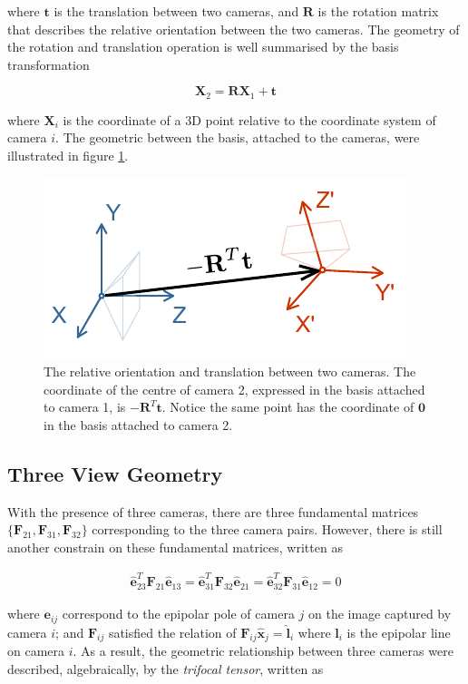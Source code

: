 \documentclass[11pt,twoside]{report}
\begin{document}
\noindent where $\mathbf{t}$ is the translation between two cameras, and $\mathbf{R}$ is the rotation matrix that describes the relative orientation between the two cameras. The geometry of the rotation and translation operation is well summarised by the basis transformation

$$
\mathbf{X}_2 = \mathbf{R} \mathbf{X}_1 + \mathbf{t}
$$

\noindent where $\mathbf{X}_i$ is the coordinate of a 3D point relative to the coordinate system of camera $i$. The geometric between the basis, attached to the cameras, were illustrated in figure \ref{fig:camera_basis}.

\begin{figure}
  \includegraphics[width=0.6\linewidth,outer]{camera-basis-change}
  \caption[Relative orientation of cameras]{The relative orientation and translation between two cameras. The coordinate of the centre of camera 2, expressed in the basis attached to camera 1, is $-\mathbf{R}^T\mathbf{t}$. Notice the same point has the coordinate of $\mathbf{0}$ in the basis attached to camera 2.}
  \label{fig:camera_basis}
\end{figure}

\subsection{Three View Geometry}

With the presence of three cameras, there are three fundamental matrices $\{\mathbf{F}_{21}, \mathbf{F}_{31}, \mathbf{F}_{32} \}$ corresponding to the three camera pairs. However, there is still another constrain on these fundamental matrices, written as \cite{hartley2003}

$$
\begin{aligned}
	  \hat{\mathbf{e}}_{23}^T\mathbf{F}_{21}\hat{\mathbf{e}}_{13}
	= \hat{\mathbf{e}}_{31}^T\mathbf{F}_{32}\hat{\mathbf{e}}_{21}
	= \hat{\mathbf{e}}_{32}^T\mathbf{F}_{31}\hat{\mathbf{e}}_{12}
	= 0
\end{aligned}
$$

\noindent where $\mathbf{e}_{ij}$ correspond to the epipolar pole of camera $j$ on the image captured by camera $i$; and $\mathbf{F}_{ij}$ satisfied the relation of $\mathbf{F}_{ij} \hat{\mathbf{x}}_j = \hat{\mathbf{l}}_i$ where $\mathbf{l}_i$ is the epipolar line on camera $i$. As a result, the geometric relationship between three cameras were described, algebraically, by the \emph{trifocal tensor}, written as
\end{document}
